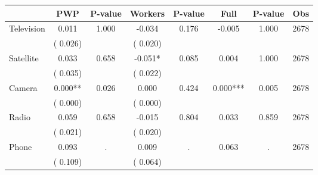 
\begin{tabular}{l*{7}{c}}\hline&\multicolumn{1}{c}{PWP}&\multicolumn{1}{c}{P-value}&\multicolumn{1}{c}{Workers}&\multicolumn{1}{c}{P-value}&\multicolumn{1}{c}{Full}&\multicolumn{1}{c}{P-value}&\multicolumn{1}{c}{Obs} \\ \hline

 Television       &              0.011       &        1.000  &             -0.034       &        0.176  &             -0.005       &              1.000 &  2678 \\ 
                       &       (       0.026)             &                               &       (       0.020)                     &                               &                                               &                                &                      \\ 

 Satellite       &              0.033       &        0.658  &             -0.051*       &        0.085  &              0.004       &              1.000 &  2678 \\ 
                       &       (       0.035)             &                               &       (       0.022)                     &                               &                                               &                                &                      \\ 

 Camera       &              0.000**       &        0.026  &              0.000       &        0.424  &              0.000***       &              0.005 &  2678 \\ 
                       &       (       0.000)             &                               &       (       0.000)                     &                               &                                               &                                &                      \\ 

 Radio       &              0.059       &        0.658  &             -0.015       &        0.804  &              0.033       &              0.859 &  2678 \\ 
                       &       (       0.021)             &                               &       (       0.020)                     &                               &                                               &                                &                      \\ 

 Phone       &              0.093       &            .  &              0.009       &            .  &              0.063       &                  . &  2678 \\ 
                       &       (       0.109)             &                               &       (       0.064)                     &                               &                                               &                                &                      \\ 

\hline \end{tabular}